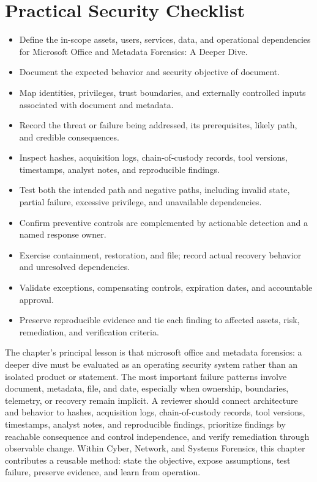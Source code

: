 \documentclass[11pt]{article}
\begin{document}
\section*{Practical Security Checklist}
\begin{itemize}[label=$\square$]
\item Define the in-scope assets, users, services, data, and operational dependencies for Microsoft Office and Metadata Forensics: A Deeper Dive.
\item Document the expected behavior and security objective of document.
\item Map identities, privileges, trust boundaries, and externally controlled inputs associated with document and metadata.
\item Record the threat or failure being addressed, its prerequisites, likely path, and credible consequences.
\item Inspect hashes, acquisition logs, chain-of-custody records, tool versions, timestamps, analyst notes, and reproducible findings.
\item Test both the intended path and negative paths, including invalid state, partial failure, excessive privilege, and unavailable dependencies.
\item Confirm preventive controls are complemented by actionable detection and a named response owner.
\item Exercise containment, restoration, and file; record actual recovery behavior and unresolved dependencies.
\item Validate exceptions, compensating controls, expiration dates, and accountable approval.
\item Preserve reproducible evidence and tie each finding to affected assets, risk, remediation, and verification criteria.
\end{itemize}
\begin{synthesisbox}
The chapter's principal lesson is that microsoft office and metadata forensics: a deeper dive must be evaluated as an operating security system rather than an isolated product or statement. The most important failure patterns involve document, metadata, file, and date, especially when ownership, boundaries, telemetry, or recovery remain implicit. A reviewer should connect architecture and behavior to hashes, acquisition logs, chain-of-custody records, tool versions, timestamps, analyst notes, and reproducible findings, prioritize findings by reachable consequence and control independence, and verify remediation through observable change. Within Cyber, Network, and Systems Forensics, this chapter contributes a reusable method: state the objective, expose assumptions, test failure, preserve evidence, and learn from operation.
\end{synthesisbox}
\end{document}
